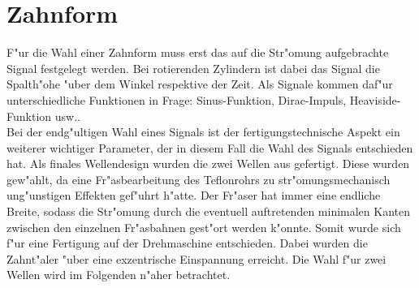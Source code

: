 \section{Zahnform}
F"ur die Wahl einer Zahnform muss erst das auf die Str"omung aufgebrachte Signal festgelegt werden. Bei rotierenden Zylindern ist dabei das Signal die Spalth"ohe "uber dem Winkel respektive der Zeit. Als Signale kommen daf"ur unterschiedliche Funktionen in Frage: Sinus-Funktion, Dirac-Impuls, Heaviside-Funktion usw..\\
Bei der endg"ultigen Wahl eines Signals ist der fertigungstechnische Aspekt ein weiterer wichtiger Parameter, der in diesem Fall die Wahl des Signals entschieden hat. Als finales Wellendesign wurden die zwei Wellen aus  gefertigt. Diese wurden gew"ahlt, da eine Fr"asbearbeitung des Teflonrohrs zu str"omungsmechanisch ung"unstigen Effekten gef"uhrt h"atte. Der Fr"aser hat immer eine endliche Breite, sodass die Str"omung durch die eventuell auftretenden minimalen Kanten zwischen den einzelnen Fr"asbahnen gest"ort werden k"onnte. Somit wurde sich f"ur eine Fertigung auf der Drehmaschine entschieden. Dabei wurden die Zahnt"aler "uber eine exzentrische Einspannung erreicht. Die Wahl f"ur zwei Wellen wird im Folgenden n"aher betrachtet.
